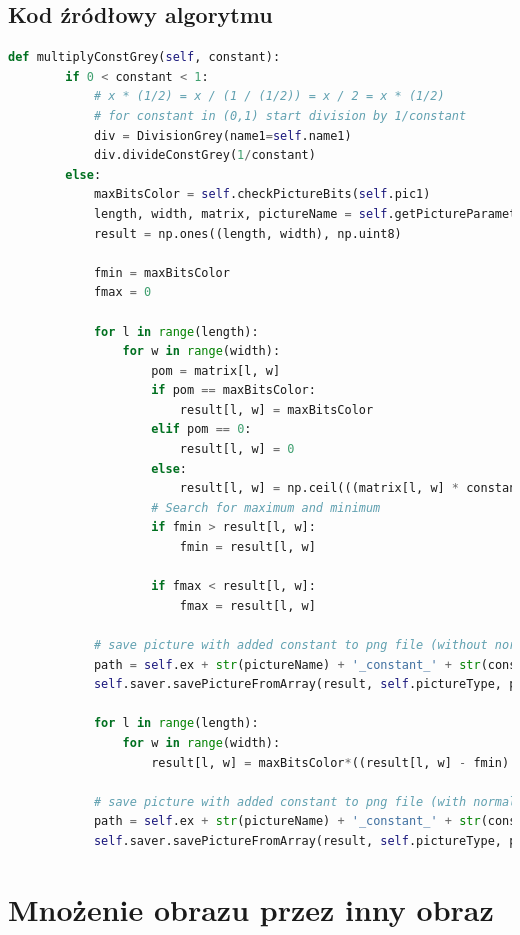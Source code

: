 \documentclass[a4paper,12pt, titlepage]{report}
\begin{document}
\subsection*{Kod źródłowy algorytmu}
\begin{lstlisting}[language=Python]
    def multiplyConstGrey(self, constant):
        if 0 < constant < 1:
            # x * (1/2) = x / (1 / (1/2)) = x / 2 = x * (1/2)
            # for constant in (0,1) start division by 1/constant
            div = DivisionGrey(name1=self.name1)
            div.divideConstGrey(1/constant)
        else:
            maxBitsColor = self.checkPictureBits(self.pic1)
            length, width, matrix, pictureName = self.getPictureParameters(self.pic1)
            result = np.ones((length, width), np.uint8)

            fmin = maxBitsColor
            fmax = 0

            for l in range(length):
                for w in range(width):
                    pom = matrix[l, w]
                    if pom == maxBitsColor:
                        result[l, w] = maxBitsColor
                    elif pom == 0:
                        result[l, w] = 0
                    else:
                        result[l, w] = np.ceil(((matrix[l, w] * constant) / maxBitsColor))
                    # Search for maximum and minimum
                    if fmin > result[l, w]:
                        fmin = result[l, w]

                    if fmax < result[l, w]:
                        fmax = result[l, w]

            # save picture with added constant to png file (without normalization)
            path = self.ex + str(pictureName) + '_constant_' + str(constant) + '.png'
            self.saver.savePictureFromArray(result, self.pictureType, path)

            for l in range(length):
                for w in range(width):
                    result[l, w] = maxBitsColor*((result[l, w] - fmin) / (fmax - fmin))

            # save picture with added constant to png file (with normalization)
            path = self.ex + str(pictureName) + '_constant_' + str(constant) + '_normalized.png'
            self.saver.savePictureFromArray(result, self.pictureType, path)
\end{lstlisting}

\section{Mnożenie obrazu przez inny obraz}
\end{document}
